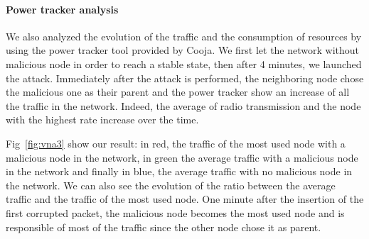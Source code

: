 \documentclass{report}
\begin{document}
\paragraph{Power tracker analysis}
We also analyzed the evolution of the traffic and the consumption of
resources by using the power tracker tool provided by Cooja. We first
let the network without malicious node in order to reach a stable state,
then after 4 minutes, we launched the attack. Immediately after the
attack is performed, the neighboring node chose the malicious one as
their parent and the power tracker show an increase of all the traffic
in the network. Indeed, the average of radio transmission and the node
with the highest rate increase over the time. 

Fig~\ref{fig:vna3} show our result: in red, the traffic of the most used node
with a malicious node in the network, in green the average traffic with
a malicious node in the network and finally in blue, the average traffic
with no malicious node in the network. We can also see the evolution of
the ratio between the average traffic and the traffic of the most used
node. One minute after the insertion of the first corrupted packet, the
malicious node becomes the most used node and is responsible of most of
the traffic since the other node chose it as parent. 
\end{document}
